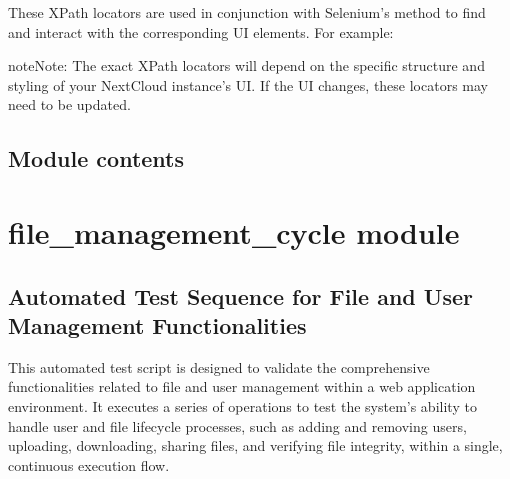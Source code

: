 \documentclass[letterpaper,10pt,english]{sphinxmanual}
\begin{document}
\sphinxAtStartPar
These XPath locators are used in conjunction with Selenium’s  method to find and interact with the corresponding UI elements. For example:

\begin{sphinxVerbatim}[commandchars=\\\{\}]
  
\end{sphinxVerbatim}

\begin{sphinxadmonition}{note}{Note:}
\sphinxAtStartPar
The exact XPath locators will depend on the specific structure and styling of your NextCloud instance’s UI. If the UI changes, these locators may need to be updated.
\end{sphinxadmonition}


\subsection{Module contents}
\label{\detokenize{config:module-config}}\label{\detokenize{config:module-contents}}
\sphinxstepscope


\section{file\_management\_cycle module}
\label{\detokenize{file_management_cycle:module-file_management_cycle}}\label{\detokenize{file_management_cycle:file-management-cycle-module}}\label{\detokenize{file_management_cycle::doc}}

\subsection{Automated Test Sequence for File and User Management Functionalities}
\label{\detokenize{file_management_cycle:automated-test-sequence-for-file-and-user-management-functionalities}}
\sphinxAtStartPar
This automated test script is designed to validate the comprehensive functionalities related to file and user management within a web application environment. It executes a series of operations to test the system’s ability to handle user and file lifecycle processes, such as adding and removing users, uploading, downloading, sharing files, and verifying file integrity, within a single, continuous execution flow.
\end{document}
